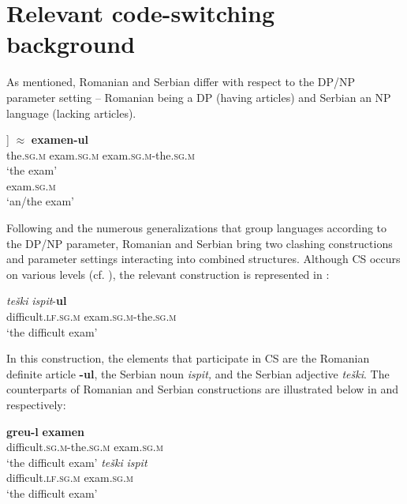 \documentclass[output=paper,
hidelinks,
newtxmath,
]{langscibook}
\begin{document}
\section{Relevant code-switching background}\label{s4}

As mentioned, Romanian and Serbian differ with respect to the DP/NP parameter setting -- Romanian being a DP (having articles) and Serbian an NP language (lacking articles).

\ea \label{ex9}
	\ea\label{ex9a}
    \gll [\textsubscript{DP} \textbf{{}-ul} [\textsubscript{NP} \textbf{examen}]]\hspace{0.6cm} $\approx$\hspace{0.7cm} \textbf{examen-ul}\\          
         {} the\textsc{.sg.m} {} exam\textsc{.sg.m} {} exam\textsc{.sg.m}-the.\textsc{sg.m}\\
         \glt `the exam'
	\ex\label{ex9b}
    \\
         {} exam\textsc{.sg.m}\\ 
         \glt `an/the exam'
         
	\z
\z

\noindent Following \citet{Boskovic2008,Boskovic2012} and the numerous generalizations that group languages according to the DP/NP parameter, Romanian and Serbian bring two clashing constructions and parameter settings interacting into combined structures. Although CS occurs on various levels (cf. \citealt{Petroj}), the relevant construction is represented in :

\ea \label{ex10}
\gll  \textit{teški} \textit{ispit}{}-\textbf{ul}\\
     difficult.\textsc{lf.sg.m} exam\textsc{.sg.m}-the\textsc{.sg.m}\\
     \glt `the difficult exam'
\z

\noindent In this construction, the elements that participate in CS are the Romanian definite article \textbf{-ul}, the Serbian noun \textit{ispit,} and the Serbian adjective \textit{teški}. The counterparts of Romanian and Serbian constructions are illustrated below in  and  respectively:

\ea \label{ex11}
	\ea\label{ex11a}
    \gll \textbf{greu-l} \textbf{examen}\\          
        difficult\textsc{.sg.m}-the\textsc{.sg.m} exam\textsc{.sg.m}\\
        \glt `the difficult exam'
	\ex\label{ex11b}
    \gll \textit{teški} \textit{ispit}\\
         difficult\textsc{.lf.sg.m} exam\textsc{.sg.m}\\ 
         \glt `the difficult exam'
	\z
\z
\end{document}
